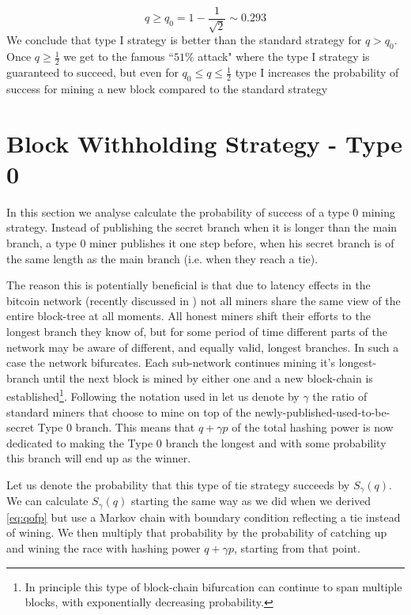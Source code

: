 \documentclass[letterpaper,12pt]{report}
\theoremstyle{plain}
\theoremstyle{definition}
\begin{document}
\begin{equation}\label{eq:qnot}
q\geq q_0=1-\frac{1}{\sqrt{2}} \sim 0.293
\end{equation}
We conclude that type I strategy is better than the standard strategy for $q>q_0$. Once $q\geq \frac{1}{2}$ we get to the famous ``$51\%$ attack" where the type I strategy is guaranteed to succeed, but even for $q_0\leq q \leq \frac{1}{2}$ type I increases the probability of success for mining a new block compared to the standard strategy


\section{Block Withholding Strategy - Type 0}

In this section we analyse calculate the probability of success of a type 0 mining strategy.
Instead of publishing the secret branch when it is longer than the main branch, a type 0 miner publishes it one step before, when his secret branch is of the same length as the main branch (i.e. when they reach a tie). 

The reason this is potentially beneficial is that due to latency effects in the bitcoin network (recently discussed in \cite{Zoharetal}) not all miners share the same view of the entire block-tree at all moments. All honest miners shift their efforts to the longest branch they know of, but for some period of time different parts of the network may be aware of different, and equally valid, longest branches. In such a case the network bifurcates. Each sub-network continues mining it's longest-branch until the next block is mined by either one and a new block-chain is established\footnote{In principle this type of block-chain bifurcation can continue to span multiple blocks, with exponentially decreasing probability.}. 
Following the notation used in \cite{Selfish} let us denote by $\gamma$ the ratio of standard miners that choose to mine on top of the newly-published-used-to-be-secret Type 0 branch.
This means that $q+\gamma p$ of the total hashing power is now dedicated to making the Type 0 branch the longest and with some probability this branch will end up as the winner. 

Let us denote the probability that this type of tie strategy succeeds by $S_{\gamma}(q)$.
We can calculate $S_{\gamma}(q)$ starting the same way as we did when we derived \ref{eq:qofp} but use a Markov chain with boundary condition reflecting a tie instead of wining. We then multiply that probability by the probability of catching up and wining the race with hashing power $q+\gamma p$, starting from that point.
\end{document}
